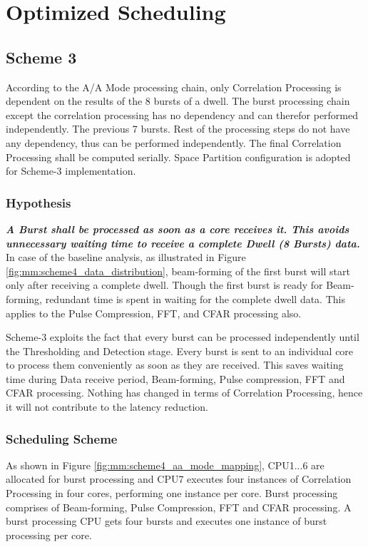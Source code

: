 \chapter{Optimized Scheduling}
\label{chap:mode_mapping}

\section{Scheme 3}
\label{sec:mm:scheme4}
According to the A/A Mode processing chain, only Correlation Processing is dependent on the results of the 8 bursts of a dwell. The burst processing chain except the correlation processing has no dependency and can therefor performed independently. The previous 7 bursts. Rest of the processing steps do not have any dependency, thus can be performed independently. The final Correlation Processing shall be computed serially. Space Partition configuration is adopted for Scheme-3 implementation.

\subsection{Hypothesis}
\textbf{\textsl{A Burst shall be processed as soon as a core receives it. This avoids unnecessary waiting time to receive a complete Dwell (8 Bursts) data.}}\\[0.2cm]
In case of the baseline analysis, as illustrated in Figure \ref{fig:mm:scheme4_data_distribution}, beam-forming of the first burst will start only after receiving a complete dwell. Though the first burst is ready for Beam-forming, redundant time is spent in waiting for the complete dwell data. This applies to the Pulse Compression, FFT, and CFAR processing also.

Scheme-3 exploits the fact that every burst can be processed independently until the Thresholding and Detection stage. Every burst is sent to an individual core to process them conveniently as soon as they are received. This saves waiting time during Data receive period, Beam-forming, Pulse compression, FFT and CFAR processing. Nothing has changed in terms of Correlation Processing, hence it will not contribute to the latency reduction.

\subsection{Scheduling Scheme}
As shown in Figure \ref{fig:mm:scheme4_aa_mode_mapping}, CPU1...6 are allocated for burst processing and CPU7 executes four instances of Correlation Processing in four cores, performing one instance per core. Burst processing comprises of Beam-forming, Pulse Compression, FFT and CFAR processing. A burst processing CPU gets four bursts and executes one instance of burst processing per core.

